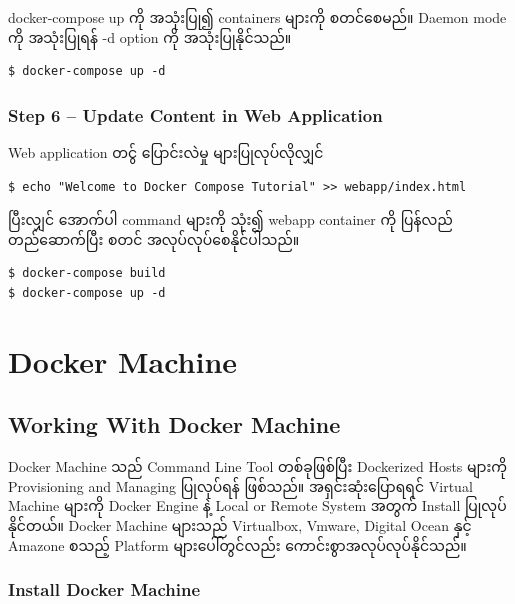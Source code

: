 docker-compose up ကို အသုံးပြု၍ containers များကို စတင်စေမည်။ Daemon
mode ကို အသုံးပြုရန် -d option ကို အသုံးပြုနိုင်သည်။

\begin{verbatim}
$ docker-compose up -d
\end{verbatim}

\hypertarget{step-6-update-content-in-web-application}{%
\subsubsection{Step 6 -- Update Content in Web Application
}\label{step-6-update-content-in-web-application}}

Web application တင်ွ ပြောင်းလဲမှု များပြုလုပ်လိုလျှင်

\begin{verbatim}
$ echo "Welcome to Docker Compose Tutorial" >> webapp/index.html
\end{verbatim}

ပြီးလျှင် အောက်ပါ command များကို သုံး၍ webapp container ကို ပြန်လည်
တည်ဆောက်ပြီး စတင် အလုပ်လုပ်စေနိုင်ပါသည်။

\begin{verbatim}
$ docker-compose build
$ docker-compose up -d
\end{verbatim}

\pagebreak

\hypertarget{docker-machine-1}{%
\section{Docker Machine}\label{docker-machine-1}}

\hypertarget{working-with-docker-machine-1}{%
\subsection{Working With Docker
Machine}\label{working-with-docker-machine-1}}

Docker Machine သည် Command Line Tool တစ်ခုဖြစ်ပြီး Dockerized Hosts
များကို Provisioning and Managing ပြုလုပ်ရန် ဖြစ်သည်။ အရှင်းဆုံးပြောရရင်
Virtual Machine များကို Docker Engine နဲ့ Local or Remote System အတွက်
Install ပြုလုပ်နိုင်တယ်။ Docker Machine များသည် Virtualbox, Vmware,
Digital Ocean နှင့် Amazone စသည့် Platform များပေါ်တွင်လည်း
ကောင်းစွာအလုပ်လုပ်နိုင်သည်။

\hypertarget{install-docker-machine-1}{%
\subsubsection{Install Docker Machine}\label{install-docker-machine-1}}

